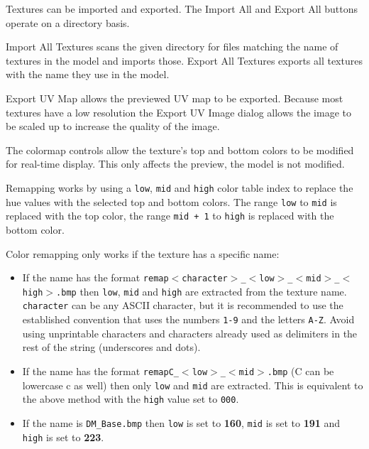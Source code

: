 \documentclass[10pt, a4paper, titlepage, oneside]{article}
\newcommand{\code}[1]{\mbox{\texttt{#1}}}
\begin{document}
\vspace{\baselineskip}
Textures can be imported and exported. The Import All and Export All buttons operate on a directory basis.

\vspace{\baselineskip}
Import All Textures scans the given directory for files matching the name of textures in the model and imports those. Export All Textures exports all textures with the name they use in the model.

\vspace{\baselineskip}
Export UV Map allows the previewed UV map to be exported. Because most textures have a low resolution the Export UV Image dialog allows the image to be scaled up to increase the quality of the image.

\vspace{\baselineskip}
The colormap controls allow the texture's top and bottom colors to be modified for real-time display. This only affects the preview, the model is not modified.

\vspace{\baselineskip}
Remapping works by using a \code{low}, \code{mid} and \code{high} color table index to replace the hue values with the selected top and bottom colors. The range \code{low} to \code{mid} is replaced with the top color, the range \code{mid + 1} to \code{high} is replaced with the bottom color.

\vspace{\baselineskip}
Color remapping only works if the texture has a specific name:

\begin{itemize}
\item If the name has the format \code{remap$<$character$>$\_$<$low$>$\_$<$mid$>$\_$<$high$>$.bmp} then \code{low}, \code{mid} and \code{high} are extracted from the texture name. \code{character} can be any ASCII character, but it is recommended to use the established convention that uses the numbers \code{1-9} and the letters \code{A-Z}. Avoid using unprintable characters and characters already used as delimiters in the rest of the string (underscores and dots).
\item If the name has the format \code{remapC\_$<$low$>$\_$<$mid$>$.bmp} (C can be lowercase c as well) then only \code{low} and \code{mid} are extracted. This is equivalent to the above method with the \code{high} value set to \code{000}.
\item If the name is \code{DM\_Base.bmp} then \code{low} is set to \textbf{160}, \code{mid} is set to \textbf{191} and \code{high} is set to \textbf{223}.
\end{itemize}
\end{document}
